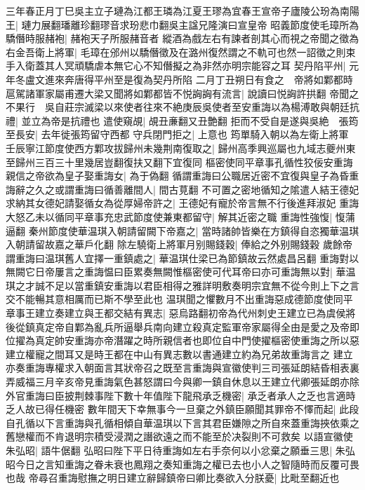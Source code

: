 三年春正月丁巳吳主立子璉為江都王璘為江夏王璆為宜春王宣帝子廬陵公玢為南陽王|{
	璉力展翻璠離珍翻璆音求玢悲巾翻吳主諡兄隆演曰宣皇帝}
昭義節度使毛璋所為驕僭時服赭袍|{
	赭袍天子所服赭音者}
縱酒為戲左右有諫者剖其心而視之帝聞之徵為右金吾衛上將軍|{
	毛璋在邠州以驕僭徵及在潞州復然謂之不軌可也然一詔徵之則束手入衛蓋其人冥頑驕虐本無它心不知僭擬之為非然亦明宗能容之耳}
契丹陷平州|{
	元年冬盧文進來奔唐得平州至是復為契丹所陷}
二月丁丑朔日有食之　帝將如鄴都時扈駕諸軍家屬甫遷大梁又聞將如鄴都皆不悦詾詾有流言|{
	說讀曰悦詾許拱翻}
帝聞之不果行　吳自莊宗滅梁以來使者往來不絶庚辰吳使者至安重誨以為楊溥敢與朝廷抗禮|{
	並立為帝是抗禮也}
遣使窺覘|{
	覘丑亷翻又丑艶翻}
拒而不受自是遂與吳絶　張筠至長安|{
	去年徙張筠留守西都}
守兵閉門拒之|{
	上意也}
筠單騎入朝以為左衛上將軍　壬辰寧江節度使西方鄴攻拔歸州未幾荆南復取之|{
	歸州高季興巡屬也九域志夔州東至歸州三百三十里幾居豈翻復扶又翻下宜復同}
樞密使同平章事孔循性狡佞安重誨親信之帝欲為皇子娶重誨女|{
	為于偽翻}
循謂重誨曰公職居近密不宜復與皇子為昏重誨辭之久之或謂重誨曰循善離間人|{
	間古莧翻}
不可置之密地循知之隂遣人結王德妃求納其女德妃請娶循女為從厚婦帝許之|{
	王德妃有寵於帝言無不行後進拜淑妃}
重誨大怒乙未以循同平章事充忠武節度使兼東都留守|{
	解其近密之職}
重誨性強愎|{
	愎蒲逼翻}
秦州節度使華温琪入朝請留闕下帝嘉之|{
	當時諸帥皆樂在方鎮得自恣獨華温琪入朝請留故嘉之華戶化翻}
除左驍衛上將軍月别賜錢穀|{
	俸給之外别賜錢穀}
歲餘帝謂重誨曰温琪舊人宜擇一重鎮處之|{
	華温琪仕梁已為節鎮故云然處昌呂翻}
重誨對以無闕它日帝屢言之重誨愠曰臣累奏無闕惟樞密使可代耳帝曰亦可重誨無以對|{
	華温琪之才誠不足以當重鎮安重誨以君臣相得之雅詳明敷奏明宗宜無不從今則上下之言交不能暢其意相厲而已斯不學至此也}
温琪聞之懼數月不出重誨惡成德節度使同平章事王建立奏建立與王都交結有異志|{
	惡烏路翻初帝為代州刺史王建立已為虞侯將後從鎮真定帝自鄴為亂兵所逼舉兵南向建立殺真定監軍帝家屬得全由是愛之及帝即位擢為真定帥安重誨亦帝潛躍之時所親信者也即位自中門使擢樞密使重誨之所以惡建立權寵之間耳又是時王都在中山有異志數以書通建立約為兄弟故重誨言之}
建立亦奏重誨專權求入朝面言其狀帝召之既至言重誨與宣徽使判三司張延朗結昏相表裏弄威福三月辛亥帝見重誨氣色甚怒謂曰今與卿一鎮自休息以王建立代卿張延朗亦除外官重誨曰臣披荆棘事陛下數十年值陛下龍飛承乏機密|{
	承乏者承人之乏也言適時乏人故已得任機密}
數年間天下幸無事今一旦棄之外鎮臣願聞其罪帝不懌而起|{
	此段自孔循以下言重誨與孔循相傾自華温琪以下言其君臣嫌隙之所自來蓋重誨挾依乘之舊戀權而不肯退明宗積受浸潤之譖欲遠之而不能至於决裂則不可救矣}
以語宣徽使朱弘昭|{
	語牛倨翻}
弘昭曰陛下平日待重誨如左右手奈何以小忿棄之願垂三思|{
	朱弘昭今日之言知重誨之眷未衰也鳳翔之奏知重誨之權已去也小人之智隨時而反覆可畏也哉}
帝尋召重誨慰撫之明日建立辭歸鎮帝曰卿比奏欲入分朕憂|{
	比毗至翻近也}
